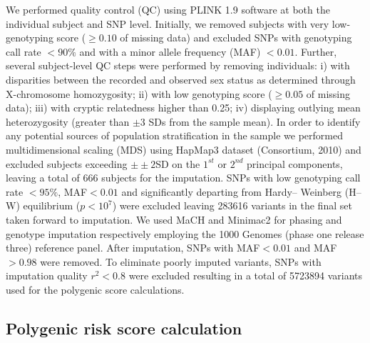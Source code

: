 We performed quality control (QC) using PLINK 1.9 software at both the individual subject and SNP level. Initially, we removed subjects with very low-genotyping score ($\geq 0.10$ of missing data) and excluded SNPs with genotyping call rate $<90\%$ and with a minor allele frequency (MAF) $< 0.01$. Further, several subject-level QC steps were performed by removing individuals: i) with disparities between the recorded and observed sex status as determined through X-chromosome homozygosity; ii) with low genotyping score ($\geq 0.05$ of missing data); iii) with cryptic relatedness higher than 0.25; iv) displaying outlying mean heterozygosity (greater than $\pm3$ SDs from the sample mean). In order to identify any potential sources of population stratification in the sample we performed multidimensional scaling (MDS) using HapMap3 dataset (Consortium, 2010) and excluded subjects exceeding $\pm±2$SD on the $1^{st}$ or $2^{nd}$ principal components, leaving a total of 666 subjects for the imputation. SNPs with low genotyping call rate $<95\%$, MAF$<0.01$ and significantly departing from Hardy– Weinberg (H–W) equilibrium ($p<10^{7}$) were excluded leaving \num{283 616} variants in the final set taken forward to imputation. We used MaCH and Minimac2 for phasing and genotype imputation respectively employing the 1000 Genomes (phase one release three) reference panel. After imputation, SNPs with MAF$<0.01$ and MAF$>0.98$ were removed. To eliminate poorly imputed variants, SNPs with imputation quality $r^{2} < 0.8$ were excluded resulting in a total of \num{5723894} variants used for the polygenic score calculations.

\subsection{Polygenic risk score calculation}

